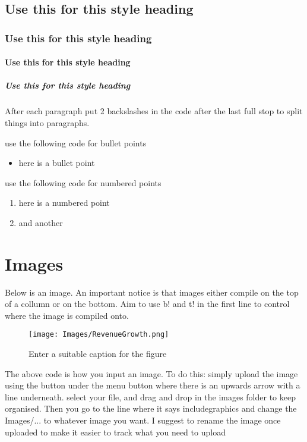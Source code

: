 \documentclass[a4paper,num-refs]{oup-contemporary}
\begin{document}
\subsection{Use this for this style heading}

\subsubsection{Use this for this style heading}

\paragraph{Use this for this style heading}

\subparagraph{Use this for this style heading}

After each paragraph put 2 backslashes in the code after the last full stop to split things into paragraphs.

use the following code for bullet points
\begin{itemize}
    \item here is a bullet point
\end{itemize}

use the following code for numbered points
\begin{enumerate}
    \item here is a numbered point 
    \item and another
\end{enumerate}



\section{Images}

Below is an image. An important notice is that images either compile on the top of a collumn or on the bottom. Aim to use b! and t! in the first line to control where the image is compiled onto.\\

\begin{figure}[b!] %
\centering
\texttt{[image: Images/RevenueGrowth.png]}
\caption{Enter a suitable caption for the figure}\label{fig:example}
\end{figure}

The above code is how you input an image. To do this: simply upload the image using the button under the menu button where there is an upwards arrow with a line underneath. select your file, and drag and drop in the images folder to keep organised. Then you go to the line where it says includegraphics and change the Images/... to whatever image you want. I suggest to rename the image once uploaded to make it easier to track what you need to upload \\
\end{document}

